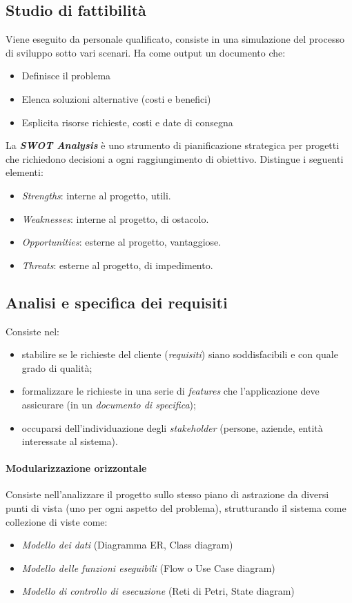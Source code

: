 \subsection{Studio di fattibilità}
Viene eseguito da personale qualificato, consiste in una simulazione del processo di sviluppo sotto vari scenari. Ha come output un documento che:
\begin{itemize}
    \item Definisce il problema
    \item Elenca soluzioni alternative (costi e benefici)
    \item Esplicita risorse richieste, costi e date di consegna
\end{itemize}
La \textit{\textbf{SWOT Analysis}} è uno strumento di pianificazione strategica per progetti che richiedono decisioni a ogni raggiungimento di obiettivo. Distingue i seguenti elementi:
\begin{itemize}
    \item \textit{Strengths}: interne al progetto, utili.
    \item \textit{Weaknesses}: interne al progetto, di ostacolo.
    \item \textit{Opportunities}: esterne al progetto, vantaggiose.
    \item \textit{Threats}: esterne al progetto, di impedimento.
\end{itemize}

\subsection{Analisi e specifica dei requisiti}
Consiste nel:
\begin{itemize}
    \item stabilire se le richieste del cliente (\textit{requisiti}) siano soddisfacibili e con quale grado di qualità;
    \item formalizzare le richieste in una serie di \textit{features} che l'applicazione deve assicurare (in un \textit{documento di specifica});
    \item occuparsi dell'individuazione degli \textit{stakeholder} (persone, aziende, entità interessate al sistema).
\end{itemize}

\paragraph{Modularizzazione orizzontale} Consiste nell'analizzare il progetto sullo stesso piano di astrazione da diversi punti di vista (uno per ogni aspetto del problema), strutturando il sistema come collezione di viste come:
\begin{itemize}
    \item \textit{Modello dei dati} (Diagramma ER, Class diagram)
    \item \textit{Modello delle funzioni eseguibili} (Flow o Use Case diagram)
    \item \textit{Modello di controllo di esecuzione} (Reti di Petri, State diagram)
\end{itemize}

